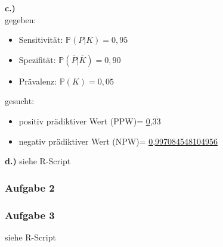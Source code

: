 \textbf{c.)}
\\
gegeben:
\begin{itemize}
	\item Sensitivität: $\mathbb{P}(P|K)=0,95$
	\item Spezifität: $\mathbb{P}(\overline{P}|\overline{K})=0,90$
	\item Prävalenz: $\mathbb{P}(K)=0,05$
\end{itemize}

gesucht:\\
\begin{itemize}
	\item positiv prädiktiver Wert (PPW)= \underline{\underline{0,$\overline{33}$}}
	\item negativ prädiktiver Wert (NPW)= \underline{\underline{0,997084548104956}}
\end{itemize}

\textbf{d.)}
siehe R-Script

\subsubsection{Aufgabe 2}

\subsubsection{Aufgabe 3}
siehe R-Script
